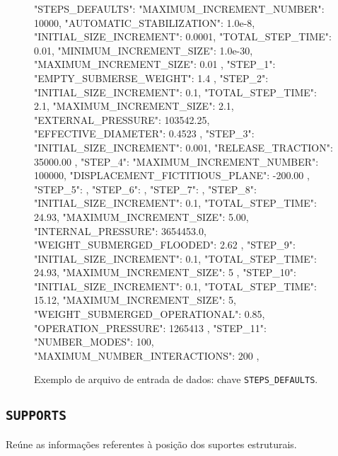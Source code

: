 \begin{figure}
\caption{Exemplo de arquivo de entrada de dados: chave \texttt{STEPS\_DEFAULTS}.\label{lst:steps_defaults}}
\begin{jsoncode}
{
"STEPS_DEFAULTS": {
  "MAXIMUM_INCREMENT_NUMBER": 10000,
  "AUTOMATIC_STABILIZATION": 1.0e-8,
  "INITIAL_SIZE_INCREMENT": 0.0001,
  "TOTAL_STEP_TIME": 0.01,
  "MINIMUM_INCREMENT_SIZE": 1.0e-30,
  "MAXIMUM_INCREMENT_SIZE": 0.01
  },
  "STEP_1": {
    "EMPTY_SUBMERSE_WEIGHT": 1.4
    },
    "STEP_2": {
      "INITIAL_SIZE_INCREMENT": 0.1,
      "TOTAL_STEP_TIME": 2.1,
      "MAXIMUM_INCREMENT_SIZE": 2.1,
      "EXTERNAL_PRESSURE": 103542.25,
      "EFFECTIVE_DIAMETER": 0.4523
  },
  "STEP_3": {
    "INITIAL_SIZE_INCREMENT": 0.001,
    "RELEASE_TRACTION": 35000.00
  },
  "STEP_4": {
    "MAXIMUM_INCREMENT_NUMBER": 100000,
    "DISPLACEMENT_FICTITIOUS_PLANE": -200.00
  },
  "STEP_5": {},
  "STEP_6": {},
  "STEP_7": {},
  "STEP_8": {
    "INITIAL_SIZE_INCREMENT": 0.1,
  "TOTAL_STEP_TIME": 24.93,
  "MAXIMUM_INCREMENT_SIZE": 5.00,
  "INTERNAL_PRESSURE": 3654453.0,
  "WEIGHT_SUBMERGED_FLOODED": 2.62
  },
  "STEP_9": {
    "INITIAL_SIZE_INCREMENT": 0.1,
    "TOTAL_STEP_TIME": 24.93,
    "MAXIMUM_INCREMENT_SIZE": 5
  },
  "STEP_10": {
    "INITIAL_SIZE_INCREMENT": 0.1,
    "TOTAL_STEP_TIME": 15.12,
    "MAXIMUM_INCREMENT_SIZE": 5,
    "WEIGHT_SUBMERGED_OPERATIONAL": 0.85,
    "OPERATION_PRESSURE": 1265413
  },
  "STEP_11": {
    "NUMBER_MODES": 100,
    "MAXIMUM_NUMBER_INTERACTIONS": 200
  },
}
\end{jsoncode}
\end{figure}

\subsection{\texttt{SUPPORTS}}

Reúne as informações referentes à posição dos suportes estruturais.

